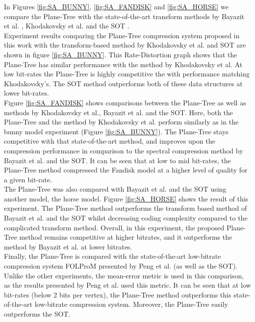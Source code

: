 

In Figures \ref{fig:SA_BUNNY}, \ref{fig:SA_FANDISK} and \ref{fig:SA_HORSE} we compare the Plane-Tree with the state-of-the-art transform methods by Bayazit et al. \cite{Bayazit103DMesh}, Khodakovsky et al. \cite{Khodakovsky00Progressive} and the SOT \cite{Lincoln13Hons}. \\

Experiment results comparing the Plane-Tree compression system proposed in this work with the transform-based method by Khodakovsky et al. and SOT are shown in figure \ref{fig:SA_BUNNY}. This Rate-Distortion graph shows that the Plane-Tree has similar performance with the method by Khodakovsky et al. At low bit-rates the Plane-Tree is highly competitive the with performance matching Khodakovsky's. The SOT method outperforms both of these data structures at lower bit-rates. \\

Figure \ref{fig:SA_FANDISK} shows comparisons between the Plane-Tree as well as methods by Khodakovsky et al., Bayazit et al. and the SOT. Here, both the Plane-Tree and the method by Khodakovsky et al. perform similarly as in the bunny model experiment (Figure \ref{fig:SA_BUNNY}). The Plane-Tree stays competitive with that state-of-the-art method, and improves upon the compression performance in comparison to the spectral compression method by Bayazit et al. and the SOT. It can be seen that at low to mid bit-rates, the Plane-Tree method compressed the Fandisk model at a higher level of quality for a given bit-rate. \\

The Plane-Tree was also compared with Bayazit et al. and the SOT using another model, the horse model. Figure \ref{fig:SA_HORSE} shows the result of this experiment. The Plane-Tree method outperforms the transform based method of Bayazit et al. and the SOT whilst decreasing coding complexity compared to the complicated transform method. Overall, in this experiment, the proposed Plane-Tree method remains competitive at higher bitrates, and it outperforms the method by Bayazit et al. at lower bitrates. \\

Finally, the Plane-Tree is compared with the state-of-the-art low-bitrate compression system FOLProM presented by Peng et al. \cite{Peng10Feature} (as well as the SOT). Unlike the other experiments, the mean-error metric is used in this comparison, as the results presented by Peng et al. used this metric. It can be seen that at low bit-rates (below 2 bits per vertex), the Plane-Tree method outperforms this state-of-the-art low-bitrate compression system. Moreover, the Plane-Tree easily outperforms the SOT. \\


